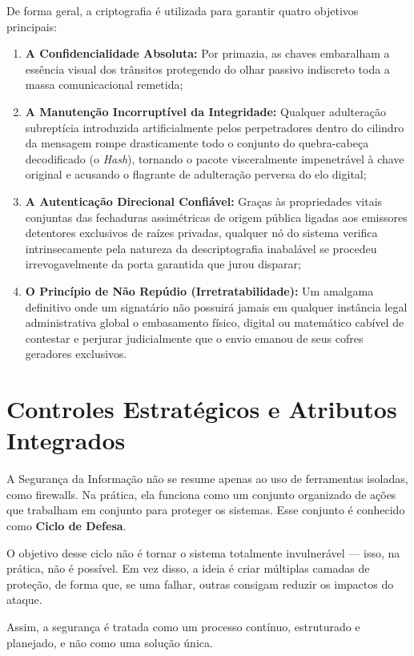 \documentclass[12pt,a4paper,twoside]{report}
\begin{document}
De forma geral, a criptografia é utilizada para garantir quatro objetivos principais:
\begin{enumerate}
    \item \textbf{A Confidencialidade Absoluta:} Por primazia, as chaves embaralham a essência visual dos trânsitos protegendo do olhar passivo indiscreto toda a massa comunicacional remetida;
    \item \textbf{A Manutenção Incorruptível da Integridade:} Qualquer adulteração subreptícia introduzida artificialmente pelos perpetradores dentro do cilindro da mensagem rompe drasticamente todo o conjunto do quebra-cabeça decodificado (o \textit{Hash}), tornando o pacote visceralmente impenetrável à chave original e acusando o flagrante de adulteração perversa do elo digital;
    \item \textbf{A Autenticação Direcional Confiável:} Graças às propriedades vitais conjuntas das fechaduras assimétricas de origem pública ligadas aos emissores detentores exclusivos de raízes privadas, qualquer nó do sistema verifica intrinsecamente pela natureza da descriptografia inabalável se procedeu irrevogavelmente da porta garantida que jurou disparar;
    \item \textbf{O Princípio de Não Repúdio (Irretratabilidade):} Um amalgama definitivo onde um signatário não possuirá jamais em qualquer instância legal administrativa global o embasamento físico, digital ou matemático cabível de contestar e perjurar judicialmente que o envio emanou de seus cofres geradores exclusivos.
\end{enumerate}

\section{Controles Estratégicos e Atributos Integrados}

A Segurança da Informação não se resume apenas ao uso de ferramentas isoladas, como firewalls. Na prática, ela funciona como um conjunto organizado de ações que trabalham em conjunto para proteger os sistemas. Esse conjunto é conhecido como \textbf{Ciclo de Defesa}.

O objetivo desse ciclo não é tornar o sistema totalmente invulnerável — isso, na prática, não é possível. Em vez disso, a ideia é criar múltiplas camadas de proteção, de forma que, se uma falhar, outras consigam reduzir os impactos do ataque.

Assim, a segurança é tratada como um processo contínuo, estruturado e planejado, e não como uma solução única.
\end{document}

